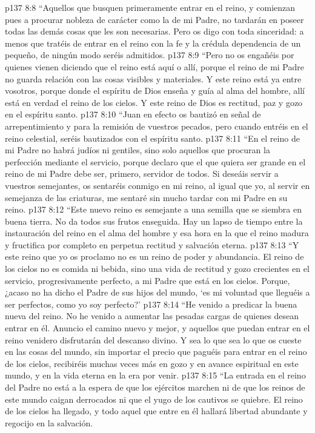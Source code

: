 \vs p137 8:8 “Aquellos que busquen primeramente entrar en el reino, y comienzan pues a procurar nobleza de carácter como la de mi Padre, no tardarán en poseer todas las demás cosas que les son necesarias. Pero os digo con toda sinceridad: a menos que tratéis de entrar en el reino con la fe y la crédula dependencia de un pequeño, de ningún modo seréis admitidos.
\vs p137 8:9 “Pero no os engañéis por quienes vienen diciendo que el reino está aquí o allí, porque el reino de mi Padre no guarda relación con las cosas visibles y materiales. Y este reino está ya entre vosotros, porque donde el espíritu de Dios enseña y guía al alma del hombre, allí está en verdad el reino de los cielos. Y este reino de Dios es rectitud, paz y gozo en el espíritu santo.
\vs p137 8:10 “Juan en efecto os bautizó en señal de arrepentimiento y para la remisión de vuestros pecados, pero cuando entréis en el reino celestial, seréis bautizados con el espíritu santo.
\vs p137 8:11 “En el reino de mi Padre no habrá judíos ni gentiles, sino solo aquellos que procuran la perfección mediante el servicio, porque declaro que el que quiera ser grande en el reino de mi Padre debe ser, primero, servidor de todos. Si deseáis servir a vuestros semejantes, os sentaréis conmigo en mi reino, al igual que yo, al servir en semejanza de las criaturas, me sentaré sin mucho tardar con mi Padre en su reino.
\vs p137 8:12 “Este nuevo reino es semejante a una semilla que se siembra en buena tierra. No da todos sus frutos enseguida. Hay un lapso de tiempo entre la instauración del reino en el alma del hombre y esa hora en la que el reino madura y fructifica por completo en perpetua rectitud y salvación eterna.
\vs p137 8:13 “Y este reino que yo os proclamo no es un reino de poder y abundancia. El reino de los cielos no es comida ni bebida, sino una vida de rectitud y gozo crecientes en el servicio, progresivamente perfecto, a mi Padre que está en los cielos. Porque, ¿acaso no ha dicho el Padre de sus hijos del mundo, ‘es mi voluntad que lleguéis a ser perfectos, como yo soy perfecto?’
\vs p137 8:14 “He venido a predicar la buena nueva del reino. No he venido a aumentar las pesadas cargas de quienes desean entrar en él. Anuncio el camino nuevo y mejor, y aquellos que puedan entrar en el reino venidero disfrutarán del descanso divino. Y sea lo que sea lo que os cueste en las cosas del mundo, sin importar el precio que paguéis para entrar en el reino de los cielos, recibiréis muchas veces más en gozo y en avance espiritual en este mundo, y en la vida eterna en la era por venir.
\vs p137 8:15 “La entrada en el reino del Padre no está a la espera de que los ejércitos marchen ni de que los reinos de este mundo caigan derrocados ni que el yugo de los cautivos se quiebre. El reino de los cielos ha llegado, y todo aquel que entre en él hallará libertad abundante y regocijo en la salvación.
